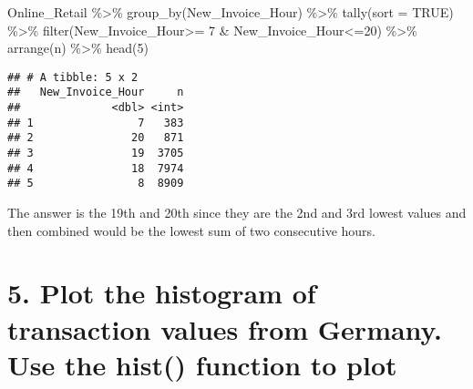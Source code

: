 \documentclass[
]{article}
\newenvironment{Shaded}{\begin{snugshade}}{\end{snugshade}}
\newcommand{\AttributeTok}[1]{\textcolor[rgb]{0.77,0.63,0.00}{#1}}
\newcommand{\ConstantTok}[1]{\textcolor[rgb]{0.00,0.00,0.00}{#1}}
\newcommand{\DecValTok}[1]{\textcolor[rgb]{0.00,0.00,0.81}{#1}}
\newcommand{\FunctionTok}[1]{\textcolor[rgb]{0.00,0.00,0.00}{#1}}
\newcommand{\NormalTok}[1]{#1}
\newcommand{\OtherTok}[1]{\textcolor[rgb]{0.56,0.35,0.01}{#1}}
\newcommand{\SpecialCharTok}[1]{\textcolor[rgb]{0.00,0.00,0.00}{#1}}
\newcommand{\StringTok}[1]{\textcolor[rgb]{0.31,0.60,0.02}{#1}}
\begin{document}
\begin{Shaded}
\begin{Highlighting}[]
\NormalTok{Online\_Retail }\SpecialCharTok{\%\textgreater{}\%} 
  \FunctionTok{group\_by}\NormalTok{(New\_Invoice\_Hour) }\SpecialCharTok{\%\textgreater{}\%} 
  \FunctionTok{tally}\NormalTok{(}\AttributeTok{sort =} \ConstantTok{TRUE}\NormalTok{) }\SpecialCharTok{\%\textgreater{}\%} 
  \FunctionTok{filter}\NormalTok{(New\_Invoice\_Hour}\SpecialCharTok{\textgreater{}=} \DecValTok{7} \SpecialCharTok{\&}\NormalTok{ New\_Invoice\_Hour}\SpecialCharTok{\textless{}=}\DecValTok{20}\NormalTok{) }\SpecialCharTok{\%\textgreater{}\%} 
  \FunctionTok{arrange}\NormalTok{(n) }\SpecialCharTok{\%\textgreater{}\%} 
  \FunctionTok{head}\NormalTok{(}\DecValTok{5}\NormalTok{)}
\end{Highlighting}
\end{Shaded}

\begin{verbatim}
## # A tibble: 5 x 2
##   New_Invoice_Hour     n
##              <dbl> <int>
## 1                7   383
## 2               20   871
## 3               19  3705
## 4               18  7974
## 5                8  8909
\end{verbatim}

The answer is the 19th and 20th since they are the 2nd and 3rd lowest
values and then combined would be the lowest sum of two consecutive
hours.

\hypertarget{plot-the-histogram-of-transaction-values-from-germany.-use-the-hist-function-to-plot}{%
\section{5. Plot the histogram of transaction values from Germany. Use
the hist() function to
plot}\label{plot-the-histogram-of-transaction-values-from-germany.-use-the-hist-function-to-plot}}

\begin{Shaded}
\end{Shaded}
\end{document}
